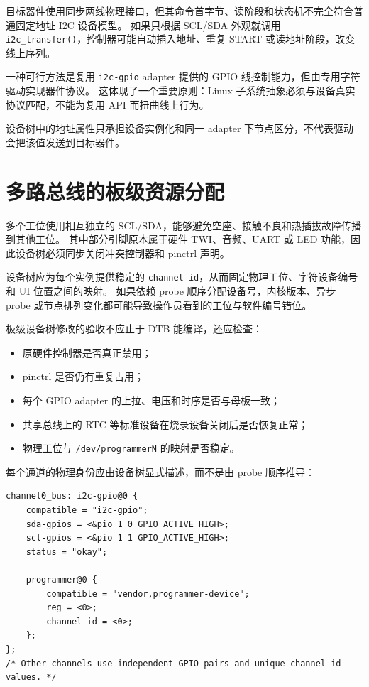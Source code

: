 目标器件使用同步两线物理接口，但其命令首字节、读阶段和状态机不完全符合普通固定地址 I2C 设备模型。
如果只根据 SCL/SDA 外观就调用 \texttt{i2c\_transfer()}，控制器可能自动插入地址、重复 START 或读地址阶段，改变线上序列。

一种可行方法是复用 \texttt{i2c-gpio} adapter 提供的 GPIO 线控制能力，但由专用字符驱动实现器件协议。
这体现了一个重要原则：Linux 子系统抽象必须与设备真实协议匹配，不能为复用 API 而扭曲线上行为。

设备树中的地址属性只承担设备实例化和同一 adapter 下节点区分，不代表驱动会把该值发送到目标器件。

\section{多路总线的板级资源分配}

多个工位使用相互独立的 SCL/SDA，能够避免空座、接触不良和热插拔故障传播到其他工位。
其中部分引脚原本属于硬件 TWI、音频、UART 或 LED 功能，因此设备树必须同步关闭冲突控制器和 pinctrl 声明。

设备树应为每个实例提供稳定的 \texttt{channel-id}，从而固定物理工位、字符设备编号和 UI 位置之间的映射。
如果依赖 probe 顺序分配设备号，内核版本、异步 probe 或节点排列变化都可能导致操作员看到的工位与软件编号错位。

板级设备树修改的验收不应止于 DTB 能编译，还应检查：
\begin{itemize}
  \item 原硬件控制器是否真正禁用；
  \item pinctrl 是否仍有重复占用；
  \item 每个 GPIO adapter 的上拉、电压和时序是否与母板一致；
  \item 共享总线上的 RTC 等标准设备在烧录设备关闭后是否恢复正常；
  \item 物理工位与 \texttt{/dev/programmerN} 的映射是否稳定。
\end{itemize}

每个通道的物理身份应由设备树显式描述，而不是由 probe 顺序推导：

\begin{lstlisting}[language=dts,caption={多通道 GPIO 两线接口的设备树结构（示意）}]
channel0_bus: i2c-gpio@0 {
    compatible = "i2c-gpio";
    sda-gpios = <&pio 1 0 GPIO_ACTIVE_HIGH>;
    scl-gpios = <&pio 1 1 GPIO_ACTIVE_HIGH>;
    status = "okay";

    programmer@0 {
        compatible = "vendor,programmer-device";
        reg = <0>;
        channel-id = <0>;
    };
};
/* Other channels use independent GPIO pairs and unique channel-id values. */
\end{lstlisting}

